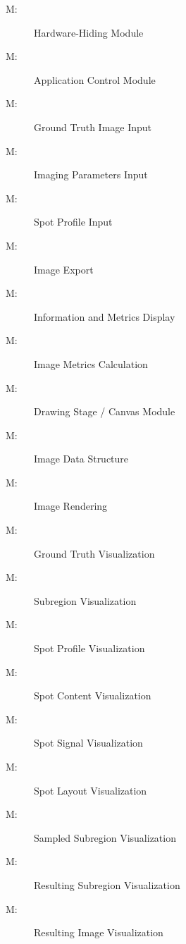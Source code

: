 \documentclass[12pt, titlepage]{article}
\newcounter{mnum}
\newcommand{\mthemnum}{M\themnum}
\begin{document}
\begin{description}
\item [ \mthemnum \label{M_HdwHide}:] Hardware-Hiding Module
\item [ \mthemnum \label{M_control}:] Application Control Module
\item [ \mthemnum \label{M_imgGTInput}:] Ground Truth Image Input
\item [ \mthemnum \label{M_params}:] Imaging Parameters Input
\item [ \mthemnum \label{M_inSpotProfile}:] Spot Profile Input
\item [ \mthemnum \label{M_export}:] Image Export
\item [ \mthemnum \label{M_infoDisp}:] Information and Metrics Display
\item [ \mthemnum \label{M_metric}:] Image Metrics Calculation
\item [ \mthemnum \label{M_drawStage}:] Drawing Stage / Canvas Module
\item [ \mthemnum \label{M_imgDataStruct}:] Image Data Structure
\item [ \mthemnum \label{M_rendering}:] Image Rendering
\item [ \mthemnum \label{M_vizGT}:] Ground Truth Visualization
\item [ \mthemnum \label{M_vizSubregion}:] Subregion Visualization
\item [ \mthemnum \label{M_vizSpotProfile}:] Spot Profile Visualization
\item [ \mthemnum \label{M_vizSpotContent}:] Spot Content Visualization
\item [ \mthemnum \label{M_vizSpotSignal}:] Spot Signal Visualization
\item [ \mthemnum \label{M_vizSpotLayout}:] Spot Layout Visualization
\item [ \mthemnum \label{M_vizSampledSub}:] Sampled Subregion Visualization
\item [ \mthemnum \label{M_vizResultSub}:] Resulting Subregion Visualization
\item [ \mthemnum \label{M_vizResultImg}:] Resulting Image Visualization
\end{description}
\end{document}
